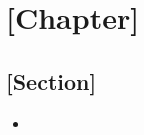 \documentclass[12pt,a4paper]{article}
\begin{document}
\tableofcontents
\cleardoublepage
\fancyhead{}

\clearpage
\fancyhead[L]{[Part]}
\clearpage
\section{[Chapter]}
\subsection{[Section]}
\begin{itemize}
    \item 
\end{itemize}
\end{document}
